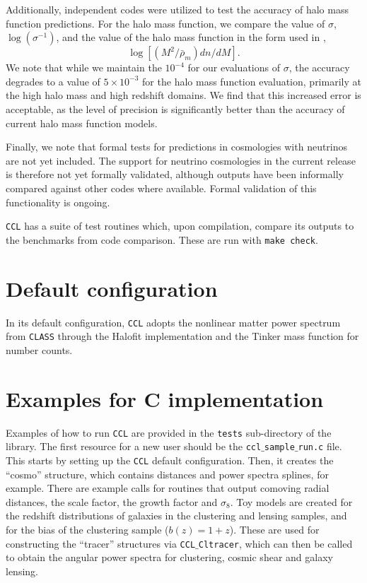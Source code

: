 \documentclass[\docopts]{\docclass}
\begin{document}
Additionally, independent codes were utilized to test the accuracy of halo mass function predictions. For the halo mass function, we compare the value of $\sigma$, $\log(\sigma^{-1})$, and the value of the halo mass function in the form used in \citep{Tinker2008},
\begin{equation}
\log[(M^2/\bar{\rho}_m)dn/dM].
\end{equation}
We note that while we maintain the $10^{-4}$ for our evaluations of $\sigma$, the accuracy degrades to a value of $5\times10^{-3}$ for the halo mass function evaluation, primarily at the high halo mass and high redshift domains. We find that this increased error is acceptable, as the level of precision is significantly better than the accuracy of current halo mass function models.

Finally, we note that formal tests for predictions in cosmologies with neutrinos are not yet included. The support for neutrino cosmologies in the current release is therefore not yet formally validated, although outputs have been informally compared against other codes where available. Formal validation of this functionality is ongoing.

{\tt CCL} has a suite of test routines which, upon compilation, compare its outputs to the benchmarks from code comparison. These are run with {\tt make check}.


\section{Default configuration}
\label{sec:default}

In its default configuration, {\tt CCL} adopts the nonlinear matter power spectrum from {\tt CLASS} through the Halofit implementation and the Tinker mass function for number counts.


\section{Examples for C implementation}
\label{sec:example}

Examples of how to run {\tt CCL} are provided in the {\tt tests} sub-directory of the library. The first resource for a new user should be the {\tt ccl$\_$sample$\_$run.c} file. This starts by setting up the {\tt CCL} default configuration. Then, it creates the ``cosmo'' structure, which contains distances and power spectra splines, for example. There are example calls for routines that output comoving radial distances, the scale factor, the growth factor and $\sigma_8$. Toy models are created for the redshift distributions of galaxies in the clustering and lensing samples, and for the bias of the clustering sample ($b(z)=1+z$). These are used for constructing the ``tracer'' structures via {\tt CCL$\_$Cltracer}, which can then be called to obtain the angular power spectra for clustering, cosmic shear and galaxy lensing.
\end{document}
